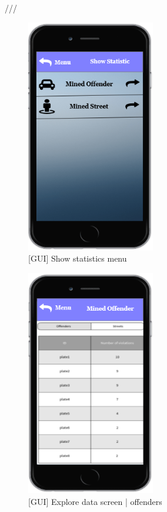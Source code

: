 ///
\begin{figure}[H]
		\centering
      \includegraphics[width=0.5\textwidth]{GUI/ShowStatistic.png}
      \caption{[GUI] Show statistics menu}   \label{fig:ShowStatistic}
\end{figure}

\begin{figure}[H]
		\centering
      \includegraphics[width=0.5\textwidth]{GUI/MinedOffender.png}
      \caption{[GUI] Explore data screen | offenders}   \label{fig:MinedOffender}
\end{figure}


